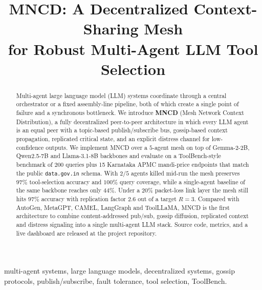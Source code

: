 \documentclass[conference]{IEEEtran}
\begin{document}
\title{MNCD: A Decentralized Context-Sharing Mesh\\
       for Robust Multi-Agent LLM Tool Selection}

\author{
}

\maketitle

\begin{abstract}
Multi-agent large language model (LLM) systems coordinate through a central
orchestrator or a fixed assembly-line pipeline, both of which create a single
point of failure and a synchronous bottleneck. We introduce \textbf{MNCD}
(Mesh Network Context Distribution), a fully decentralized peer-to-peer
architecture in which every LLM agent is an equal peer with a topic-based
publish/subscribe bus, gossip-based context propagation, replicated critical
state, and an explicit distress channel for low-confidence outputs. We
implement MNCD over a $5$-agent mesh on top of Gemma-2-2B, Qwen2.5-7B and
Llama-3.1-8B backbones and evaluate on a ToolBench-style benchmark of 200
queries plus 15 Karnataka APMC mandi-price endpoints that match the public
\texttt{data.gov.in} schema. With $2/5$ agents killed mid-run the mesh
preserves $97\%$ tool-selection accuracy and $100\%$ query coverage, while a
single-agent baseline of the same backbone reaches only $44\%$. Under a $20\%$
packet-loss link layer the mesh still hits $97\%$ accuracy with replication
factor $2.6$ out of a target $R=3$. Compared with AutoGen, MetaGPT, CAMEL,
LangGraph and ToolLLaMA, MNCD is the first architecture to combine
content-addressed pub/sub, gossip diffusion, replicated context and distress
signaling into a single multi-agent LLM stack. Source code, metrics, and a
live dashboard are released at the project repository.
\end{abstract}

\begin{IEEEkeywords}
multi-agent systems, large language models, decentralized systems, gossip
protocols, publish/subscribe, fault tolerance, tool selection, ToolBench.
\end{IEEEkeywords}
\end{document}

